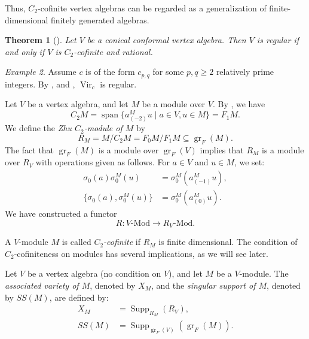 \documentclass[a4paper, 12pt, reqno]{amsart}
\newtheorem{theorem}{Theorem}[section]
\theoremstyle{remark}
\newtheorem{example}[theorem]{Example}
\DeclareMathOperator{\Vir}{Vir}
\DeclareMathOperator{\gr}{gr}
\DeclareMathOperator{\vspan}{span}
\DeclareMathOperator{\Supp}{Supp}
\begin{document}
Thus, $C_2$-cofinite vertex algebras can be regarded as a generalization of finite-dimensional finitely generated algebras.

\begin{theorem}[{\cite[Theorem 4.5]{abe_rationality_2003}}]
  \label{thr:54}
  Let $V$ be a conical conformal vertex algebra.
  Then $V$ is regular if and only if $V$ is $C_2$-cofinite and rational.
\end{theorem}

\begin{example}
  \label{exa:17}
  Assume $c$ is of the form $c_{p, q}$ for some $p, q \ge 2$ relatively prime integers.
  By ,  and , $\Vir_c$ is regular.
\end{example}

Let $V$ be a vertex algebra, and let $M$ be a module over $V$.
By , we have
\begin{equation*}
  C_2M = \vspan\{a^M_{(-2)}u \mid a \in V, u \in M\} = F_1M.
\end{equation*}
We define the \emph{Zhu $C_2$-module of $M$} by
\begin{equation*}
  R_M = M/C_2M = F_0M/F_1M \subseteq \gr_F(M).
\end{equation*}
The fact that $\gr_F(M)$ is a module over $\gr_F(V)$ implies that $R_M$ is a module over $R_V$ with operations given as follows.
For $a \in V$ and $u \in M$, we set:
\begin{align*}
  \sigma_0(a)\sigma^M_0(u) &= \sigma^M_0(a^M_{(-1)}u), \\
  \{\sigma_0(a), \sigma^M_0(u)\} &= \sigma^M_0(a^M_{(0)}u).
\end{align*}
We have constructed a functor
\begin{equation*}
  R: \text{$V$-Mod} \to \text{$R_V$-Mod}.
\end{equation*}

A $V$-module $M$ is called \emph{$C_2$-cofinite} if $R_M$ is finite dimensional.
The condition of $C_2$-cofiniteness on modules has several implications, as we will see later.

Let $V$ be a vertex algebra (no condition on $V$), and let $M$ be a $V$-module.
The \emph{associated variety of $M$}, denoted by $X_M$, and the \emph{singular support of $M$}, denoted by $SS(M)$, are defined by:
\begin{align*}
  X_M &= \Supp_{R_M}(R_V), \\
  SS(M) &= \Supp_{\gr_F(V)}(\gr_F(M)).
\end{align*}
\end{document}
